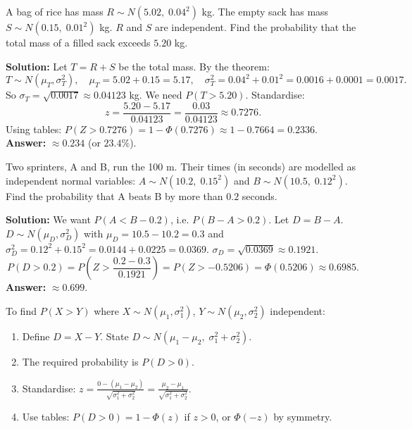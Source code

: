 \documentclass[11pt]{article}
\begin{document}
\begin{exemplebox}
A bag of rice has mass $R \sim N(5.02,\; 0.04^2)$ kg. The empty sack has mass $S \sim N(0.15,\; 0.01^2)$ kg. $R$ and $S$ are independent. Find the probability that the total mass of a filled sack exceeds $5.20$ kg.

\textbf{Solution:}
Let $T = R + S$ be the total mass. By the theorem:
\[
T \sim N(\mu_T,\sigma_T^2), \quad \mu_T = 5.02 + 0.15 = 5.17,\quad \sigma_T^2 = 0.04^2 + 0.01^2 = 0.0016 + 0.0001 = 0.0017.
\]
So $\sigma_T = \sqrt{0.0017} \approx 0.04123$ kg.
We need $P(T > 5.20)$. Standardise:
\[
z = \frac{5.20 - 5.17}{0.04123} = \frac{0.03}{0.04123} \approx 0.7276.
\]
Using tables: $P(Z > 0.7276) = 1 - \Phi(0.7276) \approx 1 - 0.7664 = 0.2336$.
\textbf{Answer:} $\approx 0.234$ (or $23.4\%$).
\end{exemplebox}

\begin{exemplebox}
Two sprinters, A and B, run the 100 m. Their times (in seconds) are modelled as independent normal variables:
$A \sim N(10.2,\; 0.15^2)$ and $B \sim N(10.5,\; 0.12^2)$. Find the probability that A beats B by more than $0.2$ seconds.

\textbf{Solution:}
We want $P(A < B - 0.2)$, i.e. $P(B - A > 0.2)$. Let $D = B - A$. 
$D \sim N(\mu_D,\sigma_D^2)$ with $\mu_D = 10.5 - 10.2 = 0.3$ and $\sigma_D^2 = 0.12^2 + 0.15^2 = 0.0144 + 0.0225 = 0.0369$.
$\sigma_D = \sqrt{0.0369} \approx 0.1921$.
\[
P(D > 0.2) = P\left(Z > \frac{0.2 - 0.3}{0.1921}\right) = P(Z > -0.5206) = \Phi(0.5206) \approx 0.6985.
\]
\textbf{Answer:} $\approx 0.699$.
\end{exemplebox}

\begin{methode}
To find $P(X > Y)$ where $X \sim N(\mu_1,\sigma_1^2)$, $Y \sim N(\mu_2,\sigma_2^2)$ independent:
\begin{enumerate}
    \item Define $D = X - Y$. State $D \sim N(\mu_1 - \mu_2,\; \sigma_1^2 + \sigma_2^2)$.
    \item The required probability is $P(D > 0)$.
    \item Standardise: $z = \frac{0 - (\mu_1 - \mu_2)}{\sqrt{\sigma_1^2 + \sigma_2^2}} = \frac{\mu_2 - \mu_1}{\sqrt{\sigma_1^2 + \sigma_2^2}}$.
    \item Use tables: $P(D > 0) = 1 - \Phi(z)$ if $z>0$, or $\Phi(-z)$ by symmetry.
\end{enumerate}
\end{methode}
\end{document}
